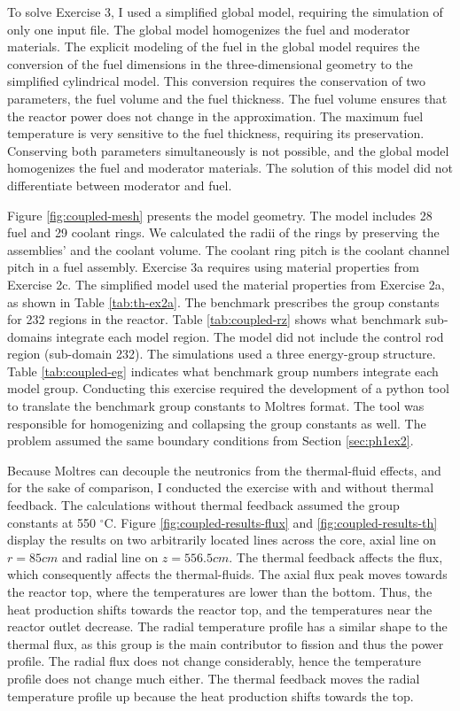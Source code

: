 To solve Exercise 3, I used a simplified global model, requiring the simulation of only one input file.
The global model homogenizes the fuel and moderator materials.
The explicit modeling of the fuel in the global model requires the conversion of the fuel dimensions in the three-dimensional geometry to the simplified cylindrical model.
This conversion requires the conservation of two parameters, the fuel volume and the fuel thickness.
The fuel volume ensures that the reactor power does not change in the approximation.
The maximum fuel temperature is very sensitive to the fuel thickness, requiring its preservation.
Conserving both parameters simultaneously is not possible, and the global model homogenizes the fuel and moderator materials.
The solution of this model did not differentiate between moderator and fuel.

Figure \ref{fig:coupled-mesh} presents the model geometry.
The model includes 28 fuel and 29 coolant rings.
We calculated the radii of the rings by preserving the assemblies' and the coolant volume.
The coolant ring pitch is the coolant channel pitch in a fuel assembly.
Exercise 3a requires using material properties from Exercise 2c.
The simplified model used the material properties from Exercise 2a, as shown in Table \ref{tab:th-ex2a}.
The benchmark prescribes the group constants for 232 regions in the reactor.
Table \ref{tab:coupled-rz} shows what benchmark sub-domains integrate each model region.
The model did not include the control rod region (sub-domain 232).
The simulations used a three energy-group structure.
Table \ref{tab:coupled-eg} indicates what benchmark group numbers integrate each model group.
Conducting this exercise required the development of a python tool to translate the benchmark group constants to Moltres format.
The tool was responsible for homogenizing and collapsing the group constants as well.
The problem assumed the same boundary conditions from Section \ref{sec:ph1ex2}.

Because Moltres can decouple the neutronics from the thermal-fluid effects, and for the sake of comparison, I conducted the exercise with and without thermal feedback.
The calculations without thermal feedback assumed the group constants at 550 $^{\circ}$C.
Figure \ref{fig:coupled-results-flux} and \ref{fig:coupled-results-th} display the results on two arbitrarily located lines across the core, axial line on $r=85 cm$ and radial line on $z=556.5 cm$.
The thermal feedback affects the flux, which consequently affects the thermal-fluids.
The axial flux peak moves towards the reactor top, where the temperatures are lower than the bottom.
Thus, the heat production shifts towards the reactor top, and the temperatures near the reactor outlet decrease.
The radial temperature profile has a similar shape to the thermal flux, as this group is the main contributor to fission and thus the power profile.
The radial flux does not change considerably, hence the temperature profile does not change much either.
The thermal feedback moves the radial temperature profile up because the heat production shifts towards the top.

